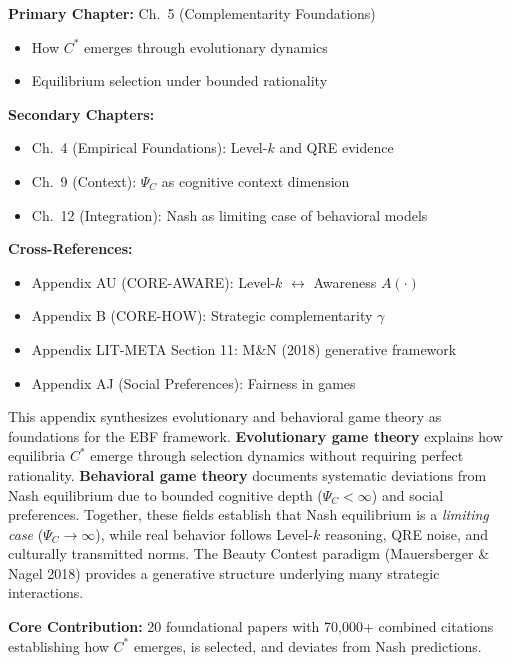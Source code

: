 \begin{tcolorbox}[colback=green!5!white, colframe=green!75!black,
    title=\textbf{Chapter References}]

\textbf{Primary Chapter:} Ch.\ 5 (Complementarity Foundations)
\begin{itemize}[nosep]
    \item How $C^*$ emerges through evolutionary dynamics
    \item Equilibrium selection under bounded rationality
\end{itemize}

\textbf{Secondary Chapters:}
\begin{itemize}[nosep]
    \item Ch.\ 4 (Empirical Foundations): Level-$k$ and QRE evidence
    \item Ch.\ 9 (Context): $\Psi_C$ as cognitive context dimension
    \item Ch.\ 12 (Integration): Nash as limiting case of behavioral models
\end{itemize}

\textbf{Cross-References:}
\begin{itemize}[nosep]
    \item Appendix AU (CORE-AWARE): Level-$k$ $\leftrightarrow$ Awareness $A(\cdot)$
    \item Appendix B (CORE-HOW): Strategic complementarity $\gamma$
    \item Appendix LIT-META Section 11: M\&N (2018) generative framework
    \item Appendix AJ (Social Preferences): Fairness in games
\end{itemize}

\end{tcolorbox}

\begin{tcolorbox}[colback=blue!5!white, colframe=blue!75!black,
    title=\textbf{Abstract}]

This appendix synthesizes evolutionary and behavioral game theory as foundations
for the EBF framework. \textbf{Evolutionary game theory} explains how equilibria
$C^*$ emerge through selection dynamics without requiring perfect rationality.
\textbf{Behavioral game theory} documents systematic deviations from Nash equilibrium
due to bounded cognitive depth ($\Psi_C < \infty$) and social preferences.
Together, these fields establish that Nash equilibrium is a \textit{limiting case}
($\Psi_C \to \infty$), while real behavior follows Level-$k$ reasoning,
QRE noise, and culturally transmitted norms. The Beauty Contest paradigm
(Mauersberger \& Nagel 2018) provides a generative structure underlying
many strategic interactions.

\textbf{Core Contribution:} 20 foundational papers with 70,000+ combined citations
establishing how $C^*$ emerges, is selected, and deviates from Nash predictions.

\end{tcolorbox}

